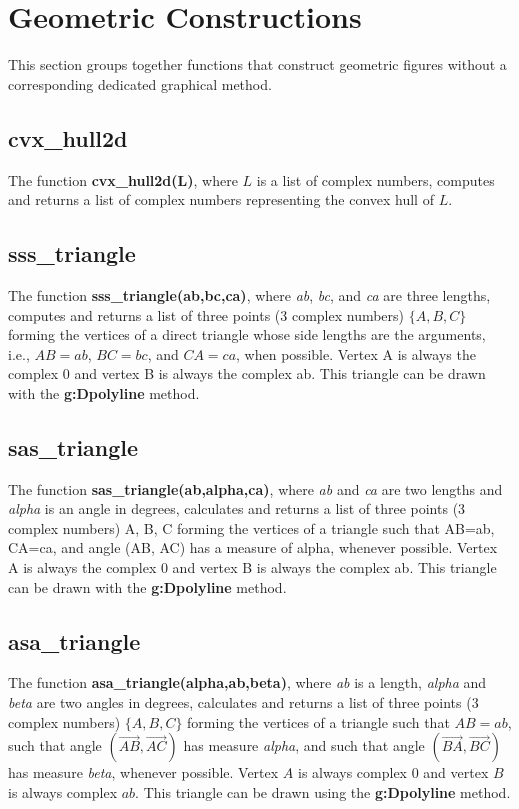 \section{Geometric Constructions}

This section groups together functions that construct geometric figures without a corresponding dedicated graphical method.

\subsection{cvx\_hull2d}

The function \textbf{cvx\_hull2d(L)}, where $L$ is a list of complex numbers, computes and returns a list of complex numbers representing the convex hull of $L$.

\subsection{sss\_triangle}

The function \textbf{sss\_triangle(ab,bc,ca)}, where \emph{ab}, \emph{bc}, and \emph{ca} are three lengths, computes and returns a list of three points (3 complex numbers) $\{A,B,C\}$ forming the vertices of a direct triangle whose side lengths are the arguments, i.e., $AB=ab$, $BC=bc$, and $CA=ca$, when possible. Vertex A is always the complex 0 and vertex B is always the complex ab. This triangle can be drawn with the \textbf{g:Dpolyline} method.

\subsection{sas\_triangle}

The function \textbf{sas\_triangle(ab,alpha,ca)}, where \emph{ab} and \emph{ca} are two lengths and \emph{alpha} is an angle in degrees, calculates and returns a list of three points (3 complex numbers) A, B, C forming the vertices of a triangle such that AB=ab, CA=ca, and angle (AB, AC) has a measure of alpha, whenever possible. Vertex A is always the complex 0 and vertex B is always the complex ab. This triangle can be drawn with the \textbf{g:Dpolyline} method.

\subsection{asa\_triangle}

The function \textbf{asa\_triangle(alpha,ab,beta)}, where \emph{ab} is a length, \emph{alpha} and \emph{beta} are two angles in degrees, calculates and returns a list of three points (3 complex numbers) $\{A,B,C\}$ forming the vertices of a triangle such that $AB=ab$, such that angle $(\vec{AB},\vec{AC})$ has measure \emph{alpha}, and such that angle $(\vec{BA},\vec{BC})$ has measure \emph{beta}, whenever possible. Vertex $A$ is always complex $0$ and vertex $B$ is always complex $ab$. This triangle can be drawn using the \textbf{g:Dpolyline} method.

